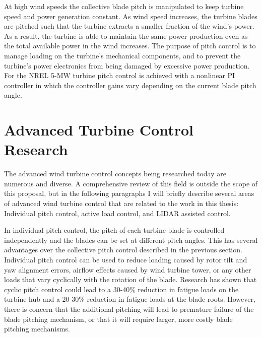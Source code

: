 At high wind speeds the collective blade pitch is manipulated to keep turbine speed and power generation constant. As wind speed increases, the turbine blades are pitched such that the turbine extracts a smaller fraction of the wind’s power.  As a result, the turbine is able to maintain the same power production even as the total available power in the wind increases.  The purpose of pitch control is to manage loading on the turbine’s mechanical components, and to prevent the turbine’s power electronics from being damaged by excessive power production.   For the NREL 5-MW turbine pitch control is achieved with a nonlinear PI controller in which the controller gains vary depending on the current blade pitch angle. 


\section{Advanced Turbine Control Research} 

The advanced wind turbine control concepts being researched today are numerous and diverse. A comprehensive review of this field is outside the scope of this proposal, but in the following paragraphs I will briefly describe several areas of advanced wind turbine control that are related to the work in this thesis: Individual pitch control, active load control, and LIDAR assisted control.

In individual pitch control, the pitch of each turbine blade is controlled independently and the blades can be set at different pitch angles.  This has several advantages over the collective pitch control described in the previous section. Individual pitch control can be used to reduce loading caused by rotor tilt and yaw alignment errors, airflow effects caused by wind turbine tower, or any other loads that vary cyclically with the rotation of the blade. Research has shown that cyclic pitch control could lead to a 30-40\% reduction in fatigue loads on the turbine hub and a 20-30\% reduction in fatigue loads at the blade roots.\cite{larsen2005,bossanyi2004} However, there is concern that the additional pitching will lead to premature failure of the blade pitching mechanism, or that it will require larger, more costly blade pitching mechanisms.\cite{vandam2008}

